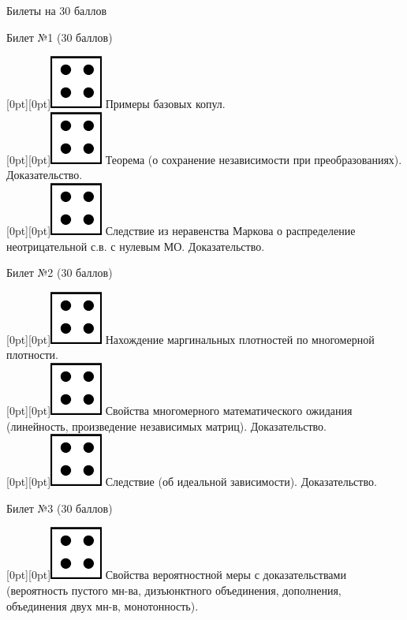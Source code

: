 \documentclass[preview]{standalone}
\begin{document}
\begin{center}
    Билеты на 30 баллов
\end{center}


\begin{center} {\Large Билет №1 (30 баллов)} \end{center}
\raisebox{-1pt}[0pt][0pt]{\includegraphics[width=0.02\linewidth]{4.png}} Примеры базовых копул. \\
\raisebox{-1pt}[0pt][0pt]{\includegraphics[width=0.02\linewidth]{4.png}} Теорема (о сохранение независимости при преобразованиях). Доказательство. \\ 
\raisebox{-1pt}[0pt][0pt]{\includegraphics[width=0.02\linewidth]{4.png}} Следствие из неравенства Маркова о распределение неотрицательной с.в. с нулевым МО. Доказательство. \\
\begin{center} {\Large Билет №2 (30 баллов)} \end{center}
\raisebox{-1pt}[0pt][0pt]{\includegraphics[width=0.02\linewidth]{4.png}} Нахождение маргинальных плотностей по многомерной плотности. \\
\raisebox{-1pt}[0pt][0pt]{\includegraphics[width=0.02\linewidth]{4.png}} Свойства многомерного математического ожидания (линейность, произведение независимых матриц). Доказательство. \\ 
\raisebox{-1pt}[0pt][0pt]{\includegraphics[width=0.02\linewidth]{4.png}} Следствие (об идеальной зависимости). Доказательство. \\
\begin{center} {\Large Билет №3 (30 баллов)} \end{center}
\raisebox{-1pt}[0pt][0pt]{\includegraphics[width=0.02\linewidth]{4.png}} Свойства вероятностной меры с доказательствами (вероятность пустого мн-ва, дизъюнктного объединения, дополнения, объединения двух мн-в, монотонность). \\
\end{document}
